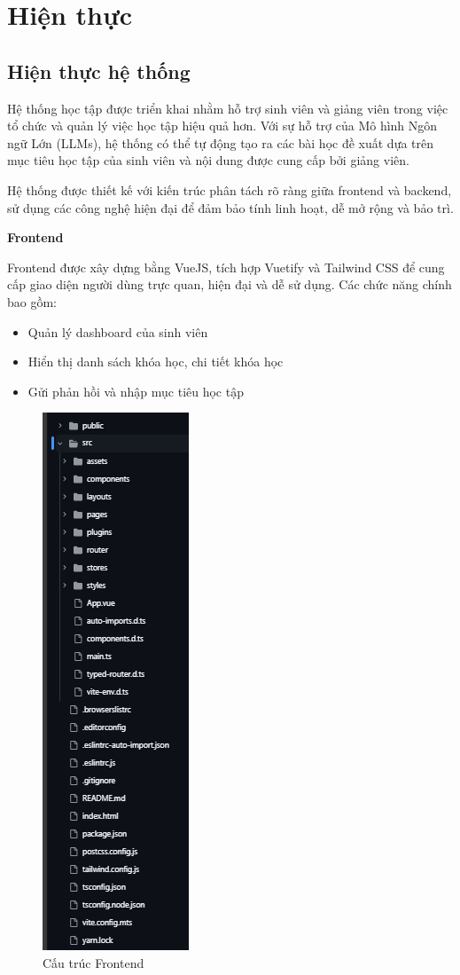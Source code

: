 \chapter{Hiện thực}

\section{Hiện thực hệ thống}
Hệ thống học tập được triển khai nhằm hỗ trợ sinh viên và giảng viên trong việc tổ chức và quản lý việc học tập hiệu quả hơn. Với sự hỗ trợ của Mô hình Ngôn ngữ Lớn (LLMs), hệ thống có thể tự động tạo ra các bài học đề xuất dựa trên mục tiêu học tập của sinh viên và nội dung được cung cấp bởi giảng viên.

Hệ thống được thiết kế với kiến trúc phân tách rõ ràng giữa frontend và backend, sử dụng các công nghệ hiện đại để đảm bảo tính linh hoạt, dễ mở rộng và bảo trì.

\textbf{Frontend} 

Frontend được xây dựng bằng VueJS, tích hợp Vuetify và Tailwind CSS để cung cấp giao diện người dùng trực quan, hiện đại và dễ sử dụng. Các chức năng chính bao gồm:

\begin{itemize}
    \item Quản lý dashboard của sinh viên
    \item Hiển thị danh sách khóa học, chi tiết khóa học
    \item Gửi phản hồi và nhập mục tiêu học tập
\end{itemize}

\begin{figure}[H]
    \centering
    \includegraphics[scale=0.5]{Images/Implement/frontendStructure.png}
    \caption{Cấu trúc Frontend}
\end{figure}


